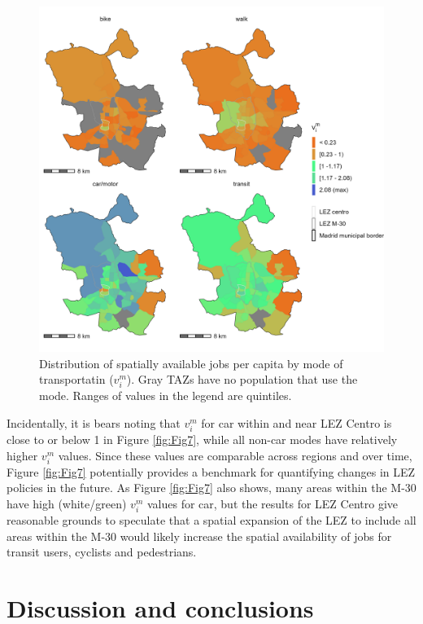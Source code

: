 \documentclass[10pt,letterpaper]{article}
\begin{document}
\begin{figure}

{\centering \includegraphics[width=0.85\linewidth]{images/SA_im_vv_zn208_plot} 

}

\caption{\label{fig:Fig7} Distribution of spatially available jobs per capita by mode of transportatin ($v_i^m$). Gray TAZs have no population that use the mode. Ranges of values in the legend are quintiles.}\label{fig:SA-per-capita-m-plot}
\end{figure}

Incidentally, it is bears noting that \(v_i^m\) for car within and near
LEZ Centro is close to or below 1 in Figure \ref{fig:Fig7}, while all
non-car modes have relatively higher \(v_i^m\) values. Since these
values are comparable across regions and over time, Figure
\ref{fig:Fig7} potentially provides a benchmark for quantifying changes
in LEZ policies in the future. As Figure \ref{fig:Fig7} also shows, many
areas within the M-30 have high (white/green) \(v_i^m\) values for car,
but the results for LEZ Centro give reasonable grounds to speculate that
a spatial expansion of the LEZ to include all areas within the M-30
would likely increase the spatial availability of jobs for transit
users, cyclists and pedestrians.

\hypertarget{discussion-and-conclusions}{%
\section{Discussion and conclusions}\label{discussion-and-conclusions}}
\end{document}
